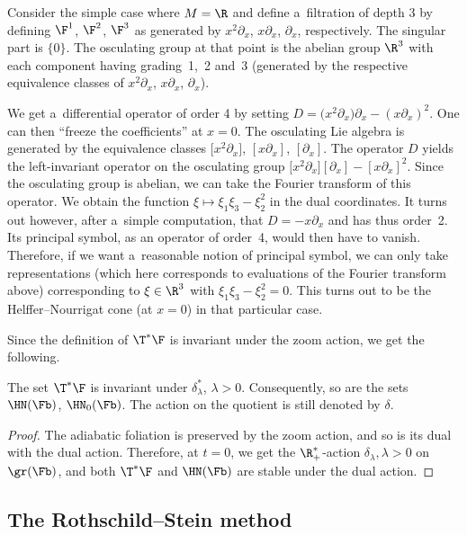 \begin{rem}\label{Remark : One cannot use all the representations}
 Consider the simple case where $M = \R$ and define a~filtration of depth 3 by defining $\F^1$, $\F^2$, $\F^3$ as generated by $x^2\partial_x$, $x\partial_x$, $\partial_x$, respectively. The singular part is $\{0\}$. The osculating group at that point is the abelian group $\R^3$ with each component having grading~1,~2 and~3 (generated by the respective equivalence classes of $x^2\partial_x$, $x\partial_x$, $\partial_x$).

 We get a~differential operator of order 4 by setting $D= \bigl(x^2\partial_x\bigr)\partial_x - (x\partial_x)^2$. One can then ``freeze the coefficients'' at $x = 0$. The osculating Lie algebra is generated by the equivalence classes $\big[x^2\partial_x\big]$, $[x\partial_x]$, $[\partial_x]$. The operator $D$ yields the left-invariant operator on the osculating group $\big[x^2\partial_x\big][\partial_x] - [x\partial_x]^2$. Since the osculating group is abelian, we can take the Fourier transform of this operator. We obtain the function $\xi \mapsto \xi_1\xi_3 - \xi_2^2$ in the dual coordinates. It turns out however, after a~simple computation, that $D = -x\partial_x$ and has thus order~2. Its principal symbol, as an operator of order~4, would then have to vanish. Therefore, if we want a~reasonable notion of principal symbol, we can only take representations (which here corresponds to evaluations of the Fourier transform above) corresponding to $\xi \in \R^3$ with $\xi_1\xi_3 - \xi_2^2 = 0$. This turns out to be the Helffer--Nourrigat cone (at $x=0$) in that particular case.
\end{rem}

Since the definition of $\T^*\F$ is invariant under the zoom action, we get the following.

\begin{prop}
 The set $\T^*\F$ is invariant under $\delta^*_{\lambda}$, $\lambda>0$. Consequently, so are the sets $\HN(\Fb)$, $\HN_0(\Fb)$. The action on the quotient is still denoted by $\delta$.
\end{prop}
\begin{proof}
 The adiabatic foliation is preserved by the zoom action, and so is its dual with the dual action. Therefore, at $t=0$, we get the $\R^*_+$-action $\delta_{\lambda}, \lambda > 0$ on $\gr(\Fb)$, and both $\T^*\F$ and $\HN(\Fb)$ are stable under the dual action.
\end{proof}

\subsection{The Rothschild--Stein method}\label{Subsection:Rothschild--Stein}

